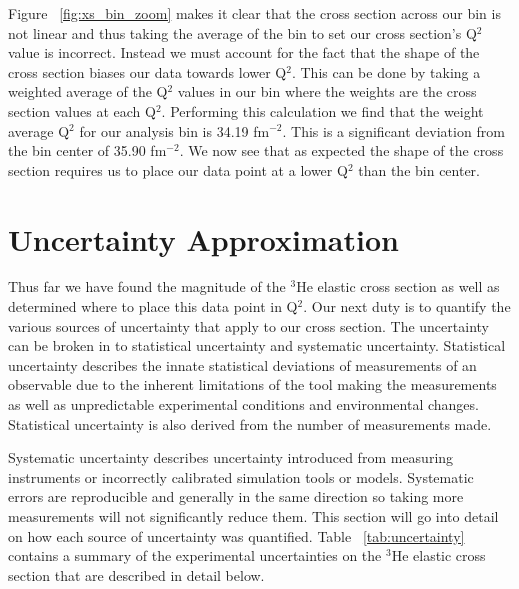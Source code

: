 Figure ~\ref{fig:xs_bin_zoom} makes it clear that the cross section across our bin is not linear and thus taking the average of the bin to set our cross section's Q$^2$ value is incorrect. Instead we must account for the fact that the shape of the cross section biases our data towards lower Q$^2$. This can be done by taking a weighted average of the Q$^2$ values in our bin where the weights are the cross section values at each Q$^2$. Performing this calculation we find that the weight average Q$^2$ for our analysis bin is 34.19 fm$^{-2}$. This is a significant deviation from the bin center of 35.90 fm$^{-2}$. We now see that as expected the shape of the cross section requires us to place our data point at a lower Q$^2$ than the bin center.

\section{Uncertainty Approximation}
\label{sec:uncertainty}

Thus far we have found the magnitude of the $^3$He elastic cross section as well as determined where to place this data point in Q$^2$. Our next duty is to quantify the various sources of uncertainty that apply to our cross section. The uncertainty can be broken in to statistical uncertainty and systematic uncertainty. Statistical uncertainty describes the innate statistical deviations of measurements of an observable due to the inherent limitations of the tool making the measurements as well as unpredictable experimental conditions and environmental changes. Statistical uncertainty is also derived from the number of measurements made. 

Systematic uncertainty describes uncertainty introduced from measuring instruments or incorrectly calibrated simulation tools or models. Systematic errors are reproducible and generally in the same direction so taking more measurements will not significantly reduce them. This section will go into detail on how each source of uncertainty was quantified. Table ~\ref{tab:uncertainty} contains a summary of the experimental uncertainties on the $^3$He elastic cross section that are described in detail below.

